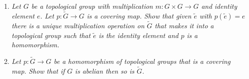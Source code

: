 \documentclass[10pt]{article}
\begin{document}
\begin{enumerate}
\begin{enumerate}
\end{enumerate}

\item \emph{Let $G$ be a topological group with multiplication $m: G \times G \rightarrow G$ and identity element $e$.  Let $p: \widetilde{G} \rightarrow G$ is a covering map.  Show that given $\tilde{e}$ with $p(\tilde{e}) = e$ there is a unique multiplication operation on $\widetilde{G}$ that makes it into a topological group such that $\tilde{e}$ is the identity element and $p$ is a homomorphism.}

\item \emph{Let $p: \widetilde{G} \rightarrow G$ be a homomorphism of topological groups that is a covering map.  Show that if $G$ is abelian then so is $\widetilde{G}$.}
\end{enumerate}
\end{document}
